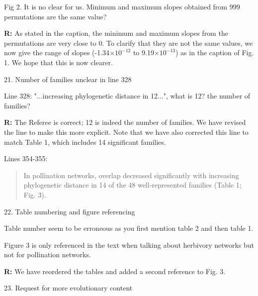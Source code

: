 \documentclass[12pt]{letter}
\newenvironment{refquote}{\bigskip \begin{it}}{\end{it}\smallskip}
\begin{document}
		\begin{refquote}
			Fig 2. It is no clear for us. Minimum and maximum slopes obtained from 999 permutations are the same value?
		\end{refquote}


		\textbf{R:} As stated in the caption, the minimum and maximum slopes from the permutations are very close to 0. To clarify that they are not the same values, we now give the range of slopes (-1.34$\times10^{-12}$ to 9.19$\times10^{-13}$) as in the caption of Fig. 1. We hope that this is now clearer.


	21. Number of families unclear in line 328

		\begin{refquote}
			Line  328: "...increasing phylogenetic distance in 12...", what is 12? the number of families?
		\end{refquote}

		\textbf{R:} The Referee is correct; 12 is indeed the number of families. We have revised the line to make this more explicit. Note that we have also corrected this line to match Table 1, which includes 14 significant families.


		Lines 354-355: 


		\begin{quotation}

		In pollination networks, overlap decreased significantly with increasing phylogenetic distance in 14 of the 48 well-represented families (Table 1; Fig. 3).

		\end{quotation}


	22. Table numbering and figure referencing

		\begin{refquote}
			Table number seem to be erroneous as you first mention table 2 and then table 1.

			\smallskip

			Figure 3 is only referenced in the text when talking about herbivory networks but not for pollination networks.
		\end{refquote}


		\textbf{R:} We have reordered the tables and added a second reference to Fig. 3.


	23. Request for more evolutionary content
\end{document}
